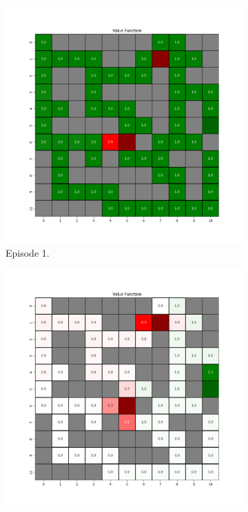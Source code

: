 \documentclass{assignment}
\begin{document}
\begin{figure}[H]
    \begin{subfigure}{0.3\textwidth}
        \includegraphics[width=\textwidth]{figures/value_td/alpha_sweep/value_function_alpha_0.001_gamma_0.95_epsilon_0.2_iteration_1.png}
    \caption{Episode 1.}
    \end{subfigure}\hfill
    \begin{subfigure}{0.3\textwidth}
        \includegraphics[width=\textwidth]{figures/value_td/alpha_sweep/value_function_alpha_0.001_gamma_0.95_epsilon_0.2_iteration_50.png}

\end{subfigure}
\end{figure}
\end{document}
